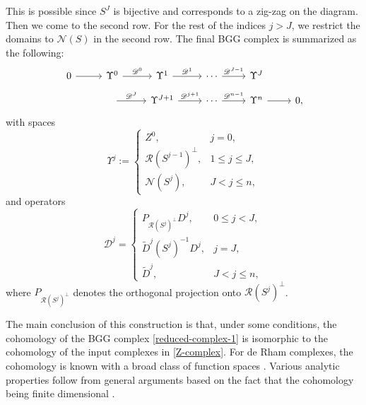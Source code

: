 \documentclass[final]{amsart}%
\newcommand{\0}{\mathaccent23}
\renewcommand\ker{\mathcal{N}}
\newcommand\ran{\mathcal{R}}
\begin{document}
This is possible since $S^{J}$ is bijective and corresponds to a zig-zag on the diagram. Then we come to the second row. For the rest of the indices $j>J$, we restrict the domains to $\ker(S)$ in the second row. 
The final BGG complex is summarized as the following:
\begin{equation}\label{reduced-complex-1}
\begin{tikzcd}[row sep=small]
0 \arrow{r}&\Upsilon^{0}\arrow{r}{\mathscr{D}^{0}} &\Upsilon^{1} \arrow{r}{\mathscr{D}^{1}} &\cdots \arrow{r}{\mathscr{D}^{J-1}}&\Upsilon^{J}\\ \quad &\arrow{r}{\mathscr{D}^{J}} & \Upsilon^{J+1} \arrow{r}{\mathscr{D}^{j+1}} &\cdots\arrow{r}{\mathscr{D}^{n-1}} &\Upsilon^{n}\arrow{r}& 0,
 \end{tikzcd}
\end{equation}
with spaces
\begin{equation}\label{defUps}
\Upsilon^{j}:=
\begin{cases}
Z^0, & j=0,\\
 \ran ({S}^{j-1} )^{\perp}, & 1\leq j\leq J,\\
 \ker ({S}^{j} ), & J<j\leq n,
\end{cases}
\end{equation}
and operators
\begin{equation}\label{Dder}
\mathscr{D}^{j}=
\begin{cases}
  P_{\ran(S^j)^{\perp}} D^{j}, & 0\le j<J,\\
 \tilde{D}^{j}(S^{j})^{-1}D^{j},& j=J,\\
\tilde{D}^{j}, & J < j \le n,
\end{cases}
\end{equation}
where $P_{\ran(S^j)^{\perp}}$ denotes the orthogonal projection onto $\ran(S^j)^{\perp}$.

The main conclusion of this construction is that, under some conditions, the cohomology of the BGG complex \eqref{reduced-complex-1} is isomorphic to the cohomology of the input complexes in \eqref{Z-complex}.  For de Rham complexes, the cohomology is known with a broad class of function spaces \cite{costabel2010bogovskiui}. Various analytic properties follow from general arguments based on the fact that the cohomology being finite dimensional \cite{arnold2021complexes}. 
\end{document}
